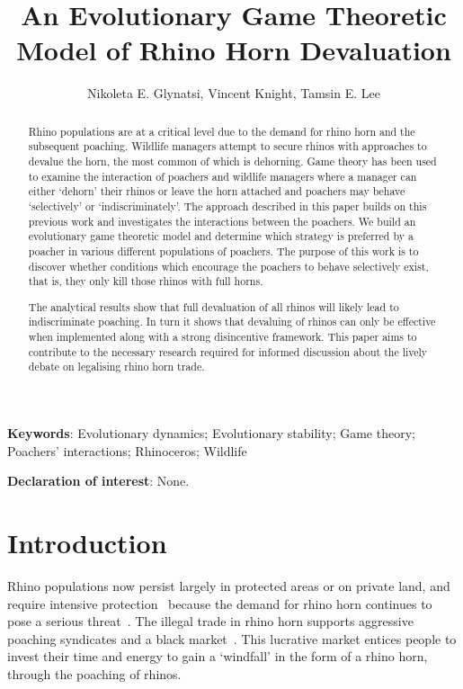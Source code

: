 \documentclass[10pt]{article}
\title{An Evolutionary Game Theoretic Model of Rhino Horn Devaluation}
\author{Nikoleta E. Glynatsi, Vincent Knight, Tamsin E. Lee}
\date{}
\begin{document}
\maketitle

\bigskip
\textbf{Keywords}: Evolutionary dynamics; Evolutionary stability; Game theory; \\
\indent Poachers' interactions; Rhinoceros; Wildlife

\bigskip

\textbf{Declaration of interest}: None.

\newpage
\linenumbers{}
\begin{abstract}

Rhino populations are at a critical level due to the demand for rhino horn and
the subsequent poaching. Wildlife managers attempt to secure rhinos with
approaches to devalue the horn, the most common of which is dehorning. Game theory
has been used to examine the interaction of poachers and wildlife managers where
a manager can either `dehorn' their rhinos or leave the horn attached and poachers
may behave `selectively' or `indiscriminately'. The approach described in this paper
builds on this previous
work and investigates the interactions between the poachers. We build an evolutionary
game theoretic model and determine which strategy is preferred by a poacher in various
different populations of poachers. The purpose of this work is to discover whether
conditions which encourage the poachers to behave selectively exist, that is,
they only kill those rhinos with full horns.

The analytical
results show that full devaluation of all rhinos will likely lead to
indiscriminate poaching. In turn it shows that devaluing of rhinos can only be
effective when implemented along with a strong disincentive framework.
This paper aims to
contribute to the necessary research required for informed discussion about the
lively debate on legalising rhino horn trade.

\end{abstract}

\section{Introduction}\label{section:introduction}

Rhino populations now persist largely in protected areas or on private land, and
require intensive protection~\cite{Ferreira2014} because the demand for rhino
horn continues to pose a serious threat~\cite{Amin2006}. The illegal trade in rhino
horn supports aggressive poaching syndicates and a black market~\cite{Nowell1992, Warchol2003}.
This lucrative market entices people to invest their time and energy to gain a
`windfall' in the form of a rhino horn, through the poaching of rhinos.
\end{document}
